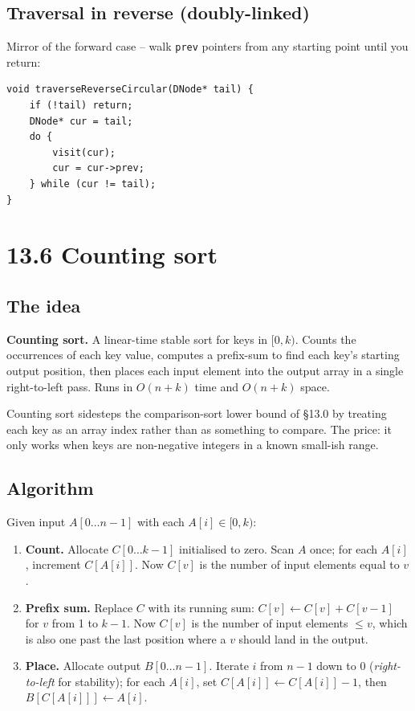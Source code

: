 \documentclass[11pt]{article}
\begin{document}
\subsection*{Traversal in reverse (doubly-linked)}

Mirror of the forward case -- walk \texttt{prev} pointers from any starting point until you return:

\begin{lstlisting}[basicstyle=\ttfamily\small,frame=single]
void traverseReverseCircular(DNode* tail) {
    if (!tail) return;
    DNode* cur = tail;
    do {
        visit(cur);
        cur = cur->prev;
    } while (cur != tail);
}
\end{lstlisting}

\section{13.6 Counting sort}

\subsection*{The idea}

\begin{defnbox}
\textbf{Counting sort.} A linear-time stable sort for keys in
$[0, k)$. Counts the occurrences of each key value, computes a
prefix-sum to find each key's starting output position, then
places each input element into the output array in a single
right-to-left pass. Runs in $O(n + k)$ time and $O(n + k)$ space.
\end{defnbox}

Counting sort sidesteps the comparison-sort lower bound of \S13.0
by treating each key as an array index rather than as something to
compare. The price: it only works when keys are non-negative
integers in a known small-ish range.

\subsection*{Algorithm}

Given input $A[0 \dots n-1]$ with each $A[i] \in [0, k)$:

\begin{enumerate}[leftmargin=*]
    \item \textbf{Count.} Allocate
          $C[0 \dots k-1]$ initialised to zero. Scan $A$ once;
          for each $A[i]$, increment $C[A[i]]$. Now $C[v]$ is the
          number of input elements equal to $v$.
    \item \textbf{Prefix sum.} Replace $C$ with its running sum:
          $C[v] \leftarrow C[v] + C[v-1]$ for $v$ from 1 to $k-1$.
          Now $C[v]$ is the number of input elements $\le v$, which
          is also one past the last position where a $v$ should
          land in the output.
    \item \textbf{Place.} Allocate output $B[0 \dots n-1]$.
          Iterate $i$ from $n-1$ down to $0$ (\emph{right-to-left}
          for stability); for each $A[i]$, set
          $C[A[i]] \leftarrow C[A[i]] - 1$, then
          $B[C[A[i]]] \leftarrow A[i]$.
\end{enumerate}
\end{document}
